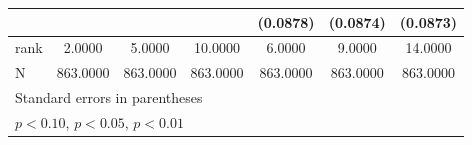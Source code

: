 {\begin{tabular}{l*{6}{c}}
                    &                     &                     &                     &    (0.0878)         &    (0.0874)         &    (0.0873)         \\
\midrule
rank                &      2.0000         &      5.0000         &     10.0000         &      6.0000         &      9.0000         &     14.0000         \\
N                   &    863.0000         &    863.0000         &    863.0000         &    863.0000         &    863.0000         &    863.0000         \\
\bottomrule
\multicolumn{7}{l}{\footnotesize Standard errors in parentheses}\\
\multicolumn{7}{l}{\footnotesize \sym{*} \(p<0.10\), \sym{**} \(p<0.05\), \sym{***} \(p<0.01\)}\\
\end{tabular}
}
